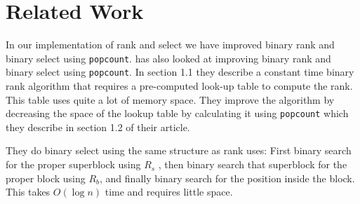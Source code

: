 \section{Related Work}
In our implementation of rank and select we have improved binary rank and binary select using \texttt{popcount}.
\cite{Gonzalez05practicalimplementation} has also looked at improving binary rank and binary select using \texttt{popcount}. 
In section 1.1 they describe a constant time binary rank algorithm that requires a pre-computed look-up table to compute the rank. 
This table uses quite a lot of memory space. 
They improve the algorithm by decreasing the space of the lookup table by calculating it using \texttt{popcount} which they describe in section 1.2 of their article. 

They do binary select using the same structure as rank uses: First binary search for the proper superblock using $R_s$ , then binary search that superblock for the proper block using $R_b$, and finally binary search for the position inside the block. 
This takes $O(\log n)$ time and requires little space.

